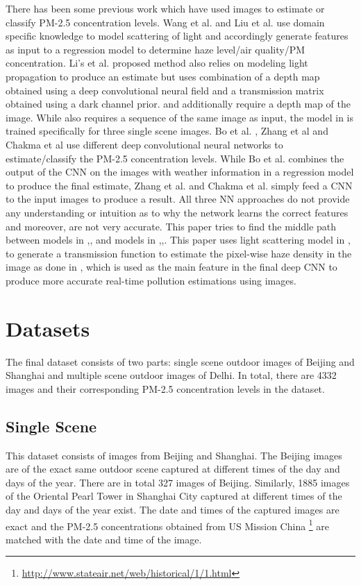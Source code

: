 \documentclass{article}
\begin{document}
There has been some previous work which have used images to estimate or classify PM-2.5 concentration levels. Wang et al. \cite{realtime} and Liu et al. \cite{PP} use domain specific knowledge to model scattering of light and accordingly generate features as input to a regression model to determine haze level/air quality/PM concentration. Li’s et al. \cite{Usergen} proposed method also relies on modeling light propagation to produce an estimate but uses combination of a depth map obtained using a deep convolutional neural field and a transmission matrix obtained using a dark channel prior. \cite{realtime} and \cite{PP} additionally require a depth map of the image. While \cite{realtime} also requires a sequence of the same image as input, the model in \cite{PP} is trained specifically for three single scene images.  Bo et al. \cite{PPconv}, Zhang et al \cite{EAPconv} and Chakma et al \cite{IBAQconv} use different deep convolutional neural networks to estimate/classify the PM-2.5 concentration levels. While Bo et al. \cite{PPconv} combines the output of the CNN on the images with weather information in a regression model to produce the final estimate, Zhang et al. \cite{EAPconv} and Chakma et al. \cite{EAPconv} simply feed a CNN to the input images to produce a result. All three NN approaches do not provide any understanding or intuition as to why the network learns the correct features and moreover, are not very accurate.
This paper tries to find the middle path between models in \cite{realtime},\cite{PP},\cite{Usergen} and models in \cite{PPconv},\cite{EAPconv},\cite{IBAQconv}. This paper uses light scattering model in \cite{realtime},\cite{PP} to generate a transmission function to estimate the pixel-wise haze density in the image as done in \cite{Usergen}, which is used as the main feature in the final deep CNN to produce more accurate real-time pollution estimations using images.

\section{Datasets}
\label{sec:Datasets} 
The final dataset consists of two parts: single scene outdoor images of Beijing and Shanghai and multiple scene outdoor images of Delhi. In total, there are 4332 images and their corresponding PM-2.5 concentration levels in the dataset.
\subsection{Single Scene}
This dataset consists of images from Beijing and Shanghai. The Beijing images are of the exact same outdoor scene captured at different times of the day and days of the year. There are in total 327 images of Beijing. Similarly, 1885 images of the Oriental Pearl Tower in Shanghai City captured at different times of the day and days of the year exist. The date and times of the captured images are exact and the PM-2.5 concentrations obtained from US Mission China \footnote{\url{http://www.stateair.net/web/historical/1/1.html}} are matched with the date and time of the image.
\end{document}
